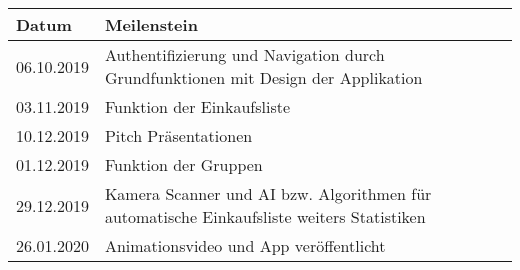 \begin{longtable}[]{@{}ll@{}}
\toprule
\begin{minipage}[b]{0.33\columnwidth}\raggedright
Datum\strut
\end{minipage} & \begin{minipage}[b]{0.61\columnwidth}\raggedright
Meilenstein\strut
\end{minipage}\tabularnewline
\midrule
\endhead
\begin{minipage}[t]{0.33\columnwidth}\raggedright
06.10.2019\strut
\end{minipage} & \begin{minipage}[t]{0.61\columnwidth}\raggedright
Authentifizierung und Navigation durch Grundfunktionen mit Design der
Applikation\strut
\end{minipage}\tabularnewline
\begin{minipage}[t]{0.33\columnwidth}\raggedright
03.11.2019\strut
\end{minipage} & \begin{minipage}[t]{0.61\columnwidth}\raggedright
Funktion der Einkaufsliste\strut
\end{minipage}\tabularnewline
\begin{minipage}[t]{0.33\columnwidth}\raggedright
10.12.2019\strut
\end{minipage} & \begin{minipage}[t]{0.61\columnwidth}\raggedright
Pitch Präsentationen\strut
\end{minipage}\tabularnewline
\begin{minipage}[t]{0.33\columnwidth}\raggedright
01.12.2019\strut
\end{minipage} & \begin{minipage}[t]{0.61\columnwidth}\raggedright
Funktion der Gruppen\strut
\end{minipage}\tabularnewline
\begin{minipage}[t]{0.33\columnwidth}\raggedright
29.12.2019\strut
\end{minipage} & \begin{minipage}[t]{0.61\columnwidth}\raggedright
Kamera Scanner und AI bzw. Algorithmen für automatische Einkaufsliste
weiters Statistiken\strut
\end{minipage}\tabularnewline
\begin{minipage}[t]{0.33\columnwidth}\raggedright
26.01.2020\strut
\end{minipage} & \begin{minipage}[t]{0.61\columnwidth}\raggedright
Animationsvideo und App veröffentlicht\strut

\end{minipage}
\end{longtable}
